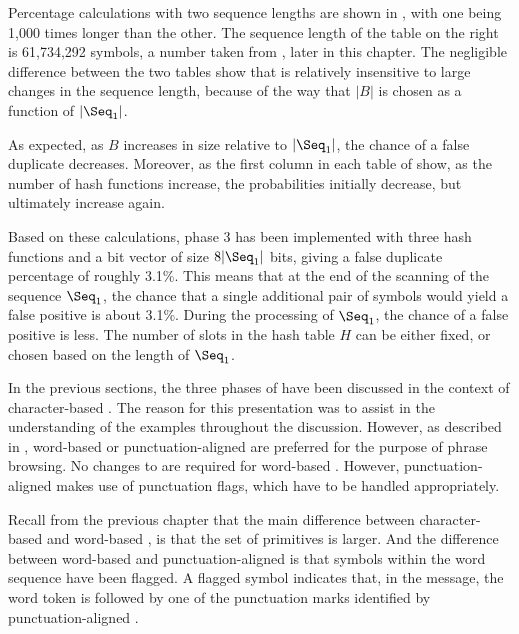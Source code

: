 Percentage calculations with two sequence lengths are shown in
, with one being 1,000 times
longer than the other.  The sequence length of the table
on the right is 61,734,292
symbols, a number taken from ,
later in this chapter.  The negligible
difference between the two tables show that 
 is relatively insensitive to large
changes in the sequence length, because of the way that $|B|$ is
chosen as a function of $|\Seq_1|$.

As expected, as $B$ increases in size relative to $|\Seq_1|$, the chance
of a false duplicate decreases.  Moreover, as the first
column in each table of  
show, as the number of hash functions increase, 
the probabilities initially decrease, but ultimately
increase again.  

Based on these calculations, phase 3 has been 
implemented with three hash functions and a bit vector of 
size $8|\Seq_1|$ bits,
giving a false duplicate percentage of roughly 3.1\%.
This means that at the end of the scanning of the sequence
$\Seq_1$, the chance that a single additional 
pair of symbols would yield a false
positive is about 3.1\%.  During the processing of $\Seq_1$,
the chance of a false positive is less.  The number of slots
in the hash table $H$ can be either fixed, or chosen based
on the length of $\Seq_1$.


In the previous sections, the three phases of \remerge have 
been discussed in the context of character-based \repair.  
The reason for this presentation was to assist in the understanding
of the examples throughout the discussion.  However, 
as described in , word-based or 
punctuation-aligned \repair are preferred for the purpose of 
phrase browsing.  No changes to \remerge are required for
word-based \repair.  However, punctuation-aligned \repair
makes use of punctuation flags, which have to be handled
appropriately.

Recall from the previous chapter
that the main difference between character-based \repair and
word-based \repair, is that
the set of primitives is larger.  And the difference 
between word-based \repair and punctuation-aligned \repair 
is that symbols within the word sequence have been flagged.  
A flagged symbol indicates that, in the message, the word token 
is followed by one of the punctuation marks identified by
punctuation-aligned \repair.

